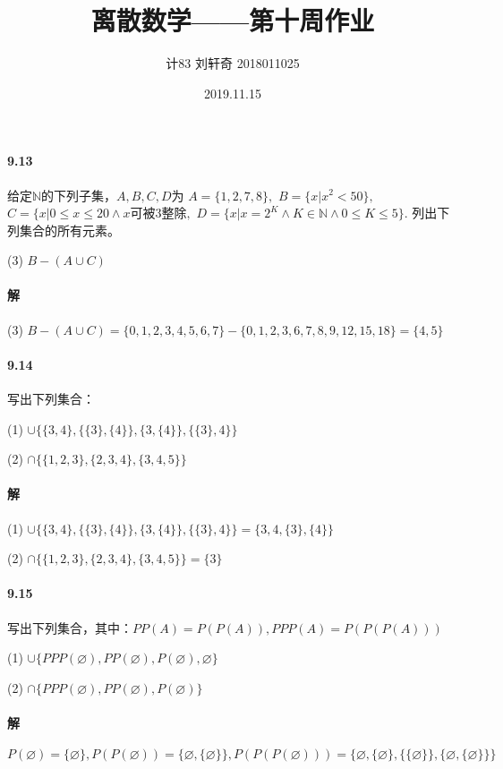 \documentclass[UTF8]{ctexart}
\title{离散数学——第十周作业}
\author{计83  刘轩奇  2018011025}
\date{2019.11.15}
\newcommand{\snatural}{\mathbb{N}}
\begin{document}
\maketitle

\paragraph{9.13} \label{9.13}
给定$\snatural$的下列子集，$A,B,C,D$为 
$A = \{ 1,2,7,8 \},$
$B = \{ x | x^2 < 50 \} ,$
$C = \{ x|0 \le x \le 20 \land x \text {可被} 3\text {整除} ,$
$D = \{ x|x=2^K \land K \in \snatural \land 0 \le K \le 5 \}.$
列出下列集合的所有元素。

(3) $B-(A \cup C)$

\paragraph{解}
(3) $B - (A \cup C) = \{ 0,1,2,3,4,5,6,7 \} - \{ 0,1,2,3,6,7,8,9,12,15,18 \} = \{ 4,5 \} $

\paragraph{9.14} \label{9.14}
写出下列集合：

(1) $\cup \{ \{ 3,4 \} , \{ \{ 3 \} , \{ 4 \} \} , \{ 3, \{ 4 \} \} , \{ \{ 3 \} ,4 \} \}$

(2) $\cap \{ \{ 1,2,3 \} , \{ 2,3,4 \} , \{ 3,4,5 \} \} $

\paragraph{解}
(1) $\cup \{ \{ 3,4 \} , \{ \{ 3 \} , \{ 4 \} \} , \{ 3, \{ 4 \} \} , \{ \{ 3 \} ,4 \} \} =  \{ 3,4, \{ 3 \} , \{ 4 \} \} $

(2) $\cap \{ \{ 1,2,3 \} , \{ 2,3,4 \} , \{ 3,4,5 \} \}  = \{ 3 \}$

\paragraph{9.15} \label{9.15}
写出下列集合，其中：$PP(A)=P(P(A)), PPP(A)=P(P(P(A)))$

(1) $ \cup \{ PPP(\varnothing), PP(\varnothing), P(\varnothing), \varnothing \} $

(2) $ \cap \{ PPP(\varnothing), PP(\varnothing), P(\varnothing) \} $

\paragraph{解}
$$P(\varnothing) = \{ \varnothing \} , P(P(\varnothing)) = \{ \varnothing, \{ \varnothing \} \} , P(P(P(\varnothing))) = \{ \varnothing, \{ \varnothing \} , \{ \{ \varnothing \} \} , \{ \varnothing, \{ \varnothing \} \} \} $$
\end{document}
